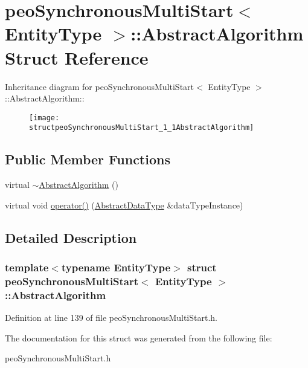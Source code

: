 \hypertarget{structpeoSynchronousMultiStart_1_1AbstractAlgorithm}{
\section{peo\-Synchronous\-Multi\-Start$<$ Entity\-Type $>$::Abstract\-Algorithm Struct Reference}
\label{structpeoSynchronousMultiStart_1_1AbstractAlgorithm}
}
Inheritance diagram for peo\-Synchronous\-Multi\-Start$<$ Entity\-Type $>$::Abstract\-Algorithm::\begin{figure}[H]
\begin{center}
\leavevmode
\texttt{[image: structpeoSynchronousMultiStart\_1\_1AbstractAlgorithm]}
\end{center}
\end{figure}
\subsection*{Public Member Functions}
\begin{CompactItemize}
\item 
\hypertarget{structpeoSynchronousMultiStart_1_1AbstractAlgorithm_c77be114590c79c1b96d3afbe73596e0}{
virtual \hyperlink{structpeoSynchronousMultiStart_1_1AbstractAlgorithm_c77be114590c79c1b96d3afbe73596e0}{$\sim$Abstract\-Algorithm} ()}
\label{structpeoSynchronousMultiStart_1_1AbstractAlgorithm_c77be114590c79c1b96d3afbe73596e0}

\item 
\hypertarget{structpeoSynchronousMultiStart_1_1AbstractAlgorithm_a5f7790ac2b99e798e4e84f2d5a5f78c}{
virtual void \hyperlink{structpeoSynchronousMultiStart_1_1AbstractAlgorithm_a5f7790ac2b99e798e4e84f2d5a5f78c}{operator()} (\hyperlink{structpeoSynchronousMultiStart_1_1AbstractDataType}{Abstract\-Data\-Type} \&data\-Type\-Instance)}
\label{structpeoSynchronousMultiStart_1_1AbstractAlgorithm_a5f7790ac2b99e798e4e84f2d5a5f78c}

\end{CompactItemize}


\subsection{Detailed Description}
\subsubsection*{template$<$typename Entity\-Type$>$ struct peo\-Synchronous\-Multi\-Start$<$ Entity\-Type $>$::Abstract\-Algorithm}





Definition at line 139 of file peo\-Synchronous\-Multi\-Start.h.

The documentation for this struct was generated from the following file:\begin{CompactItemize}
\item 
peo\-Synchronous\-Multi\-Start.h\end{CompactItemize}
